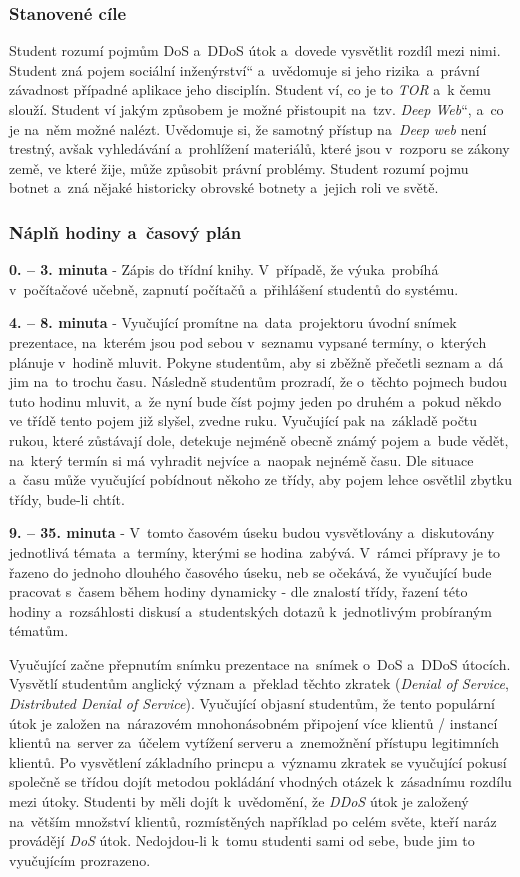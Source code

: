 \documentclass[a4paper, 12pt]{article}
\providecommand{\uv}[1]{\quotedblbase #1\textquotedblleft}
\begin{document}
\subsubsection{Stanovené cíle}
Student rozumí pojmům DoS a~DDoS útok a~dovede vysvětlit rozdíl mezi nimi. Student zná pojem \uv{sociální inženýrství} a~uvědomuje si jeho rizika~a~právní závadnost případné aplikace jeho disciplín. Student ví, co je to \textit{TOR} a~k čemu slouží. Student ví jakým způsobem je možné přistoupit na~tzv. \uv{\textit{Deep Web}}, a~co je na~něm možné nalézt. Uvědomuje si, že samotný přístup na~\textit{Deep web} není trestný, avšak vyhledávání a~prohlížení materiálů, které jsou v~rozporu se zákony země, ve které žije, může způsobit právní problémy. Student rozumí pojmu botnet a~zná nějaké historicky obrovské botnety a~jejich roli ve světě. 
 

\subsubsection{Náplň hodiny a~časový plán}
\indent\textbf{0. -- 3. minuta} - Zápis do třídní knihy. V~případě, že výuka~probíhá v~počítačové učebně, zapnutí počítačů a~přihlášení studentů do systému.

\textbf{4. -- 8. minuta} - Vyučující promítne na~data~projektoru úvodní snímek prezentace, na~kterém jsou pod sebou v~seznamu vypsané termíny, o~kterých plánuje v~hodině mluvit. Pokyne studentům, aby si zběžně přečetli seznam a~dá jim na~to trochu času. Následně studentům prozradí, že o~těchto pojmech budou tuto hodinu mluvit, a~že nyní bude číst pojmy jeden po druhém a~pokud někdo ve třídě tento pojem již slyšel, zvedne ruku. Vyučující pak na~základě počtu rukou, které zůstávají dole, detekuje nejméně obecně známý pojem a~bude vědět, na~který termín si má vyhradit nejvíce a~naopak nejnémě času. Dle situace a~času může vyučující pobídnout někoho ze třídy, aby pojem lehce osvětlil zbytku třídy, bude-li chtít.

\textbf{9. -- 35. minuta} - V~tomto časovém úseku budou vysvětlovány a~diskutovány jednotlivá témata~a~termíny, kterými se hodina~zabývá. V~rámci přípravy je to řazeno do jednoho dlouhého časového úseku, neb se očekává, že vyučující bude pracovat s~časem během hodiny dynamicky - dle znalostí třídy, řazení této hodiny a~rozsáhlosti diskusí a~studentských dotazů k~jednotlivým probíraným tématům.

Vyučující začne přepnutím snímku prezentace na~snímek o~DoS a~DDoS útocích. Vysvětlí studentům anglický význam a~překlad těchto zkratek (\textit{Denial of Service}, \textit{Distributed Denial of Service}). Vyučující objasní studentům, že tento populární útok je založen na~nárazovém mnohonásobném připojení více klientů / instancí klientů na~server za~účelem vytížení serveru a~znemožnění přístupu legitimních klientů. Po vysvětlení základního princpu a~významu zkratek se vyučující pokusí společně se třídou dojít metodou pokládání vhodných otázek k~zásadnímu rozdílu mezi útoky. Studenti by měli dojít k~uvědomění, že \textit{DDoS} útok je založený na~větším množství klientů, rozmístěných například po celém světe, kteří naráz provádějí \textit{DoS} útok. Nedojdou-li k~tomu studenti sami od sebe, bude jim to vyučujícím prozrazeno.
\end{document}
